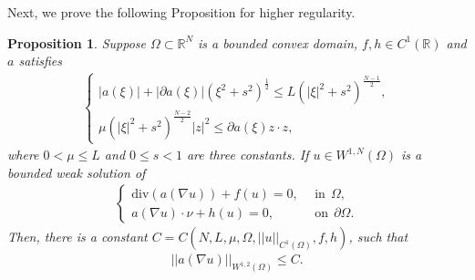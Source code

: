 \documentclass[reqno, 11pt]{amsart} %
\numberwithin{equation}{section}
\newtheorem{prop}[thm]{Proposition}
\theoremstyle{definition}
\newcommand{\pa}{\partial}
\newcommand{\R}{\mathbb{R}}
\begin{document}
Next, we prove the  following Proposition for higher regularity. 
\begin{prop}\label{prop2-3}
    Suppose $\Omega \subset \R^N$ is a bounded convex domain, $f , h \in C^1(\R)$%
    and $a$ satisfies
    \begin{align}\label{a-condition}
        \begin{cases}
            |a(\xi)| + |\pa a(\xi)|(\xi^2 + s^2)^{\frac{1}{2}} \leq L(|\xi|^2 + s^2)^{\frac{N-1}{2}}, \\
            \mu (|\xi|^2 + s^2)^{\frac{N-2}{2}} |z|^2 \leq \pa a(\xi)z \cdot z,
        \end{cases}
    \end{align}
    where $0 < \mu \leq L$ and $0 \leq s < 1$ are three constants. If $u \in W^{1,N}(\Omega)$ is a bounded weak solution of
    \begin{align*}
        \begin{cases}
            \text{div} (a(\nabla u )) + f(u) = 0, \ \ & \text{in} \ \ \Omega, \\
            a(\nabla u) \cdot \nu + h(u) = 0, \ \ & \text{on} \ \ \pa \Omega.
        \end{cases}
    \end{align*}
    Then, there is a constant $C = C(N ,L ,\mu, \Omega, ||u||_{C^1(\Omega)}, f, h)$, such that
    \begin{align*}
        ||a(\nabla u)||_{W^{1,2}(\Omega)} \leq C.
    \end{align*}
\end{prop}
\end{document}
